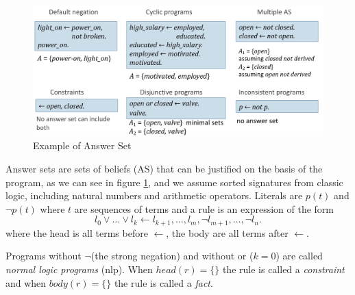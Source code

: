 \begin{figure}
	\includegraphics[width=\textwidth]{Images/answerSet}
	\caption{Example of Answer Set}
	\label{img:answerSets}
\end{figure}
Answer sets are sets of beliefs (AS) that can be justified on the basis of the program, 
as we can see in figure \ref{img:answerSets}, and we assume sorted signatures from 
classic logic, including natural numbers and arithmetic operators.\newline
Literals are $p(t)$ and $\neg p(t)$ where $t$ are sequences of terms and 
a rule is an expression of the form 
\[ l_0 \lor \dots \lor l_k \gets l_{k+1}, \dots, l_m, \neg l_{m+1}, \dots, \neg l_n. \]
where the head is all terms before $\gets$, the body are all terms after $\gets$.

Programs without $\neg$(the strong negation) and without or ($k = 0$) are called 
\emph{normal logic programs} (nlp).\newline
When  $head(r) = \{ \}$ the rule is called a \emph{constraint} and when $body(r) = \{\}$
the rule is called a \emph{fact}.

